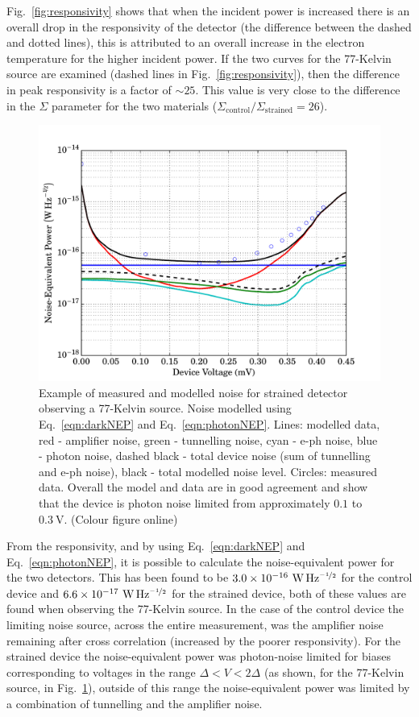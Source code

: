 \documentclass[final]{svjour2}
\begin{document}
\par
Fig.~\ref{fig:responsivity} shows that when the incident power is increased there is an overall drop in the responsivity of the detector (the difference between the dashed and dotted lines), this is attributed to an overall increase in the electron temperature for the higher incident power. If the two curves for the 77-Kelvin source are examined (dashed lines in Fig.~\ref{fig:responsivity}), then the difference in peak responsivity is a factor of $\sim 25$. This value is very close to the difference in the $\varSigma$ parameter for the two materials ($\varSigma_{\mathrm{control}}/\varSigma_{\mathrm{strained}} = 26$).
\par 
\begin{figure}[htb]
\centering
\includegraphics[width = 0.48\columnwidth]{02_strained_SiCEB_noiseModel_77}
\caption{Example of measured and modelled noise for strained detector observing a 77-Kelvin source. Noise modelled using Eq.~\ref{eqn:darkNEP} and Eq.~\ref{eqn:photonNEP}. Lines: modelled data, red - amplifier noise, green - tunnelling noise, cyan - e-ph noise, blue - photon noise, dashed black - total device noise (sum of tunnelling and e-ph noise), black - total modelled noise level. Circles: measured data. Overall the model and data are in good agreement and show that the device is photon noise limited from approximately $0.1$ to $0.3~\mathrm{V}$. (Colour figure online)
\label{fig:noise}}
\end{figure}
From the responsivity, and by using Eq.~\ref{eqn:darkNEP} and Eq.~\ref{eqn:photonNEP}, it is possible to calculate the noise-equivalent power for the two detectors. This has been found to be $3.0 \times 10^{-16}~\mathrm{W\,Hz^{\nicefrac{-1}{2}}}$ for the control device and $6.6\times 10^{-17}~\mathrm{W\,Hz^{\nicefrac{-1}{2}}}$ for the strained device, both of these values are found when observing the 77-Kelvin source. In the case of the control device the limiting noise source, across the entire measurement, was the amplifier noise remaining after cross correlation (increased by the poorer responsivity). For the strained device the noise-equivalent power was photon-noise limited for biases corresponding to voltages in the range $\varDelta < V < 2\varDelta$ (as shown, for the 77-Kelvin source, in Fig.~\ref{fig:noise}), outside of this range the noise-equivalent power was limited by a combination of tunnelling and the amplifier noise.
%
\end{document}
